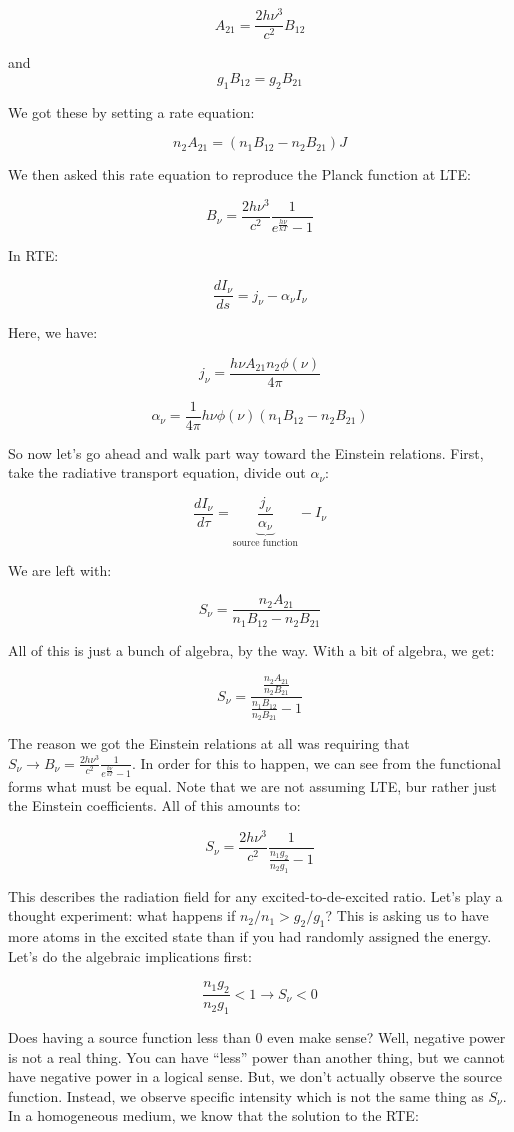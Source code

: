 \documentclass{article}
\newcommand{\be}{\begin{equation}}
\newcommand{\ee}{\end{equation}}
\newcommand{\planck}{\frac{2h\nu^3}{c^2} \frac{1}{e^{\frac{h\nu}{kT}} - 1}}
\def\ato{{A_{21}}}
\def\bto{{B_{21}}}
\def\bot{{B_{12}}}
\def\ato{{A_{21}}}
\def\bto{{B_{21}}}
\def\bot{{B_{12}}}
\def\ato{{A_{21}}}
\def\bto{{B_{21}}}
\def\bot{{B_{12}}}
\begin{document}
\be
\ato = \frac{2h\nu^3}{c^2}\bot
\ee

and 
\be
g_1 \bot = g_2 \bto
\ee

We got these by setting a rate equation:

\be
n_2 \ato = \left(n_1 \bot - n_2 \bto\right)J
\ee

We then asked this rate equation to reproduce the Planck function at LTE:

\be
B_\nu = \planck
\ee

In RTE:

\be
\frac{d I_\nu}{d s} = j_\nu - \alpha_\nu I_\nu
\ee

Here, we have:

\be
j_\nu = \frac{h\nu \ato n_2 \phi(\nu)}{4\pi}
\ee

\be
\alpha_\nu = \frac{1}{4\pi} h\nu \phi(\nu) \left(n_1 \bot - n_2 \bto\right)
\ee

So now let's go ahead and walk part way toward the Einstein relations. First, take the radiative transport equation, divide out $\alpha_\nu$:

\be
\frac{d I_\nu}{d\tau} = \underbrace{\frac{j_\nu}{\alpha_\nu}}_\text{source function} - I_\nu
\ee

We are left with:

\be
S_\nu = \frac{n_2 \ato }{n_1 \bot - n_2 \bto}
\ee

All of this is just a bunch of algebra, by the way. With a bit of algebra, we get:

\be
S_\nu = \frac{\frac{n_2 \ato}{n_2 \bto}}{\frac{n_1 \bot}{n_2 \bto} -1 }
\ee

The reason we got the Einstein relations at all was requiring that $S_\nu \to B_\nu = \planck$. In order for this to happen, we can see from the functional forms what must be equal. Note that we are not assuming LTE, bur rather just the Einstein coefficients. All of this amounts to:

\be
S_\nu = \frac{2h\nu^3}{c^2}\frac{1}{\frac{n_1 g_2}{n_2 g_1}-1}
\ee

This describes the radiation field for any excited-to-de-excited ratio. Let's play a thought experiment: what happens if $n_2/n_1 > g_2/g_1$? This is asking us to have more atoms in the excited state than if you had randomly assigned the energy. Let's do the algebraic implications first:

\be
\frac{n_1 g_2}{n_2 g_1} < 1 \rightarrow S_\nu < 0 
\ee

Does having a source function less than 0 even make sense? Well, negative power is not a real thing. You can have ``less'' power than another thing, but we cannot have negative power in a logical sense. But, we don't actually observe the source function. Instead, we observe specific intensity which is not the same thing as $S_\nu$. In a homogeneous medium, we know that the solution to the RTE:
\end{document}
